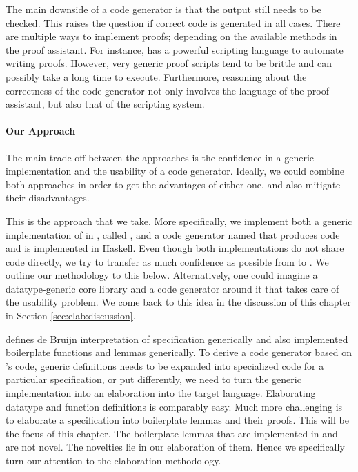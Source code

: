 The main downside of a code generator is that the output still needs to be
checked. This raises the question if correct code is generated in all cases.
There are multiple ways to implement proofs; depending on the available methods
in the proof assistant. For instance, \Coq has a powerful scripting language to
automate writing proofs. However, very generic proof scripts tend to be brittle
and can possibly take a long time to execute. Furthermore, reasoning about the
correctness of the code generator not only involves the language of the proof
assistant, but also that of the scripting system.


\paragraph{Our Approach}

The main trade-off between the approaches is the confidence in a generic
implementation and the usability of a code generator. Ideally, we could combine
both approaches in order to get the advantages of either one, and also mitigate
their disadvantages.

This is the approach that we take. More specifically, we implement both a
generic implementation of \Knot in \Coq, called \Yarn, and a code generator
named \Needle that produces \Coq code and is implemented in Haskell. Even though
both implementations do not share code directly, we try to transfer as much
confidence as possible from \Yarn to \Needle. We outline our methodology to this
below. Alternatively, one could imagine a datatype-generic core library and a
code generator around it that takes care of the usability problem. We come back
to this idea in the discussion of this chapter in Section
\ref{sec:elab:discussion}.

\Yarn defines de Bruijn interpretation of \Knot specification generically and
also implemented boilerplate functions and lemmas generically. To derive a code
generator based on \Yarn's code, generic definitions needs to be expanded into
specialized code for a particular specification, or put differently, we need to
turn the generic implementation into an elaboration into the target language.
Elaborating datatype and function definitions is comparably easy. Much more
challenging is to elaborate a specification into boilerplate lemmas and their
proofs. This will be the focus of this chapter. The boilerplate lemmas that are
implemented in \Yarn and \Needle are not novel. The novelties lie in our
elaboration of them. Hence we specifically turn our attention to the elaboration
methodology.



